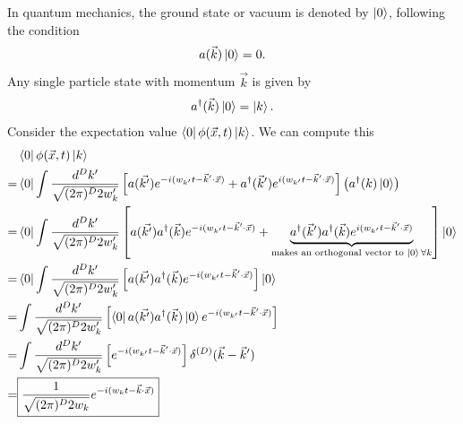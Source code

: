 \documentclass{book}
\theoremstyle{definition}
\newcommand{\f}[2]{\frac{#1}{#2}}
\newcommand{\lp}{\left(}
\newcommand{\rp}{\right)}
\newcommand{\lb}{\left[}
\newcommand{\rb}{\right]}
\begin{document}
In quantum mechanics, the ground state or vacuum is denoted by $\ket{0}$, following the condition
\begin{align}
a(\vec{k})\ket{0} = 0.
\end{align}
Any single particle state with momentum $\vec{k}$ is given by
\begin{align}
a^\dagger(\vec{k})\ket{0} = \ket{k}.
\end{align}
Consider the expectation value $\bra{0}\phi(\vec{x},t)\ket{k}$. We can compute this
\begin{align}
&\bra{0}\phi(\vec{x},t)\ket{k} \nonumber\\
= &\bra{0}\int \f{d^D k'}{\sqrt{(2\pi)^D 2 w_k'}} \lb a(\vec{k'})e^{-i(w_{k'} t - \vec{k}'\cdot\vec{x})} + a^\dagger(\vec{k}')e^{i(w_{k'} t - \vec{k}'\cdot \vec{x})} \rb \lp a^\dagger(k)\ket{0} \rp \nonumber \\ 
= &\bra{0}\int \f{d^D k'}{\sqrt{(2\pi)^D 2 w_k'}} \lb a(\vec{k'}) a^\dagger(\vec{k})e^{-i(w_{k'} t - \vec{k}'\cdot\vec{x})} + \underbrace{a^\dagger(\vec{k}')a^\dagger(\vec{k})e^{i(w_{k'} t - \vec{k}'\cdot \vec{x})} }_{\text{makes an orthogonal vector to $\ket{0} \forall k$}}\rb\ket{0} \nonumber \\ 
= &\bra{0}\int \f{d^D k'}{\sqrt{(2\pi)^D 2 w_k'}} \lb a(\vec{k'}) a^\dagger(\vec{k})e^{-i(w_{k'} t - \vec{k}'\cdot\vec{x})}\rb\ket{0} \nonumber \\ 
= &\int \f{d^D k'}{\sqrt{(2\pi)^D 2 w_k'}} \lb \bra{0} a(\vec{k'}) a^\dagger(\vec{k})\ket{0}e^{-i(w_{k'} t - \vec{k}'\cdot\vec{x})}\rb \nonumber \\ 
= &\int \f{d^D k'}{\sqrt{(2\pi)^D 2 w_k'}} \lb e^{-i(w_{k'} t - \vec{k}'\cdot\vec{x})}\rb \delta^{(D)}(\vec{k} - \vec{k}') \nonumber\\
= & \boxed{\f{1}{\sqrt{(2\pi)^D 2w_k}}e^{-i(w_k t - \vec{k}\cdot\vec{x})}}
\end{align}
\end{document}
